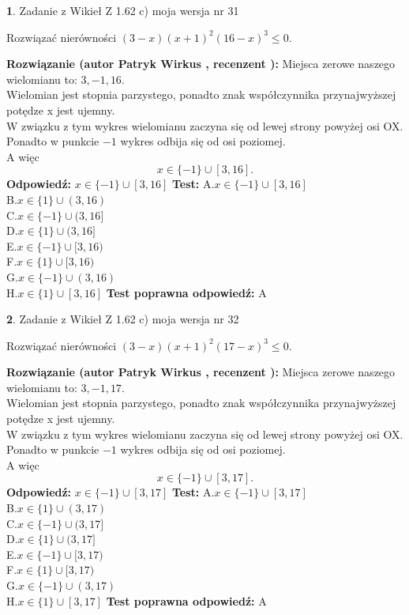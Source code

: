 \documentclass[12pt, a4paper]{article}
\theoremstyle{definition} %
\newtheorem{zad}{}
\newcommand{\zadStart}[1]{\begin{zad}#1\newline}
\newcommand{\zadStop}{\end{zad}}
\newcommand{\rozwStart}[2]{\noindent \textbf{Rozwiązanie (autor #1 , recenzent #2): }\newline}
\newcommand{\rozwStop}{\newline}
\newcommand{\odpStart}{\noindent \textbf{Odpowiedź:}\newline}
\newcommand{\odpStop}{\newline}
\newcommand{\testStart}{\noindent \textbf{Test:}\newline}
\newcommand{\testStop}{\newline}
\newcommand{\kluczStart}{\noindent \textbf{Test poprawna odpowiedź:}\newline}
\newcommand{\kluczStop}{\newline}
\begin{document}
\zadStart{Zadanie z Wikieł Z 1.62 c) moja wersja nr 31}

Rozwiązać nierówności $(3-x)(x+1)^{2}(16-x)^{3}\le0$.
\zadStop
\rozwStart{Patryk Wirkus}{}
Miejsca zerowe naszego wielomianu to: $3, -1, 16$.\\
Wielomian jest stopnia parzystego, ponadto znak współczynnika przy\linebreak najwyższej potędze x jest ujemny.\\ W związku z tym wykres wielomianu zaczyna się od lewej strony powyżej osi OX.\\
Ponadto w punkcie $-1$ wykres odbija się od osi poziomej.\\
A więc $$x \in \{-1\} \cup [3,16].$$
\rozwStop
\odpStart
$x \in \{-1\} \cup [3,16]$
\odpStop
\testStart
A.$x \in \{-1\} \cup [3,16]$\\
B.$x \in \{1\} \cup (3,16)$\\
C.$x \in \{-1\} \cup (3,16]$\\
D.$x \in \{1\} \cup (3,16]$\\
E.$x \in \{-1\} \cup [3,16)$\\
F.$x \in \{1\} \cup [3,16)$\\
G.$x \in \{-1\} \cup (3,16)$\\
H.$x \in \{1\} \cup [3,16]$
\testStop
\kluczStart
A
\kluczStop



\zadStart{Zadanie z Wikieł Z 1.62 c) moja wersja nr 32}

Rozwiązać nierówności $(3-x)(x+1)^{2}(17-x)^{3}\le0$.
\zadStop
\rozwStart{Patryk Wirkus}{}
Miejsca zerowe naszego wielomianu to: $3, -1, 17$.\\
Wielomian jest stopnia parzystego, ponadto znak współczynnika przy\linebreak najwyższej potędze x jest ujemny.\\ W związku z tym wykres wielomianu zaczyna się od lewej strony powyżej osi OX.\\
Ponadto w punkcie $-1$ wykres odbija się od osi poziomej.\\
A więc $$x \in \{-1\} \cup [3,17].$$
\rozwStop
\odpStart
$x \in \{-1\} \cup [3,17]$
\odpStop
\testStart
A.$x \in \{-1\} \cup [3,17]$\\
B.$x \in \{1\} \cup (3,17)$\\
C.$x \in \{-1\} \cup (3,17]$\\
D.$x \in \{1\} \cup (3,17]$\\
E.$x \in \{-1\} \cup [3,17)$\\
F.$x \in \{1\} \cup [3,17)$\\
G.$x \in \{-1\} \cup (3,17)$\\
H.$x \in \{1\} \cup [3,17]$
\testStop
\kluczStart
A
\kluczStop
\end{document}
